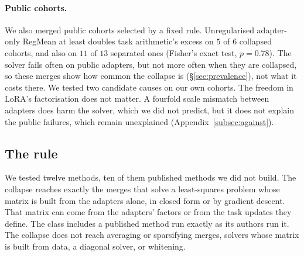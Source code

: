 \paragraph{Public cohorts.} We also merged public cohorts selected by a
fixed rule. Unregularised adapter-only RegMean at least doubles task
arithmetic's excess on $5$ of $6$ collapsed cohorts, and also on $11$ of $13$
separated ones (Fisher's exact test, $p = 0.78$). The solver fails often on
public adapters, but not more often when they are collapsed, so these merges
show how common the collapse is (\S\ref{sec:prevalence}), not what it costs
there. We tested two candidate causes on our own cohorts. The freedom in
LoRA's factorisation does not matter. A fourfold scale mismatch between
adapters does harm the solver, which we did not predict, but it does not
explain the public failures, which remain unexplained
(Appendix~\ref{subsec:against}).

\subsection{The rule}\label{subsec:rule}

We tested twelve methods, ten of them published methods we did not build.
The collapse reaches exactly the merges that solve a least-squares problem whose
matrix is built from the adapters alone, in closed form or by gradient
descent. That matrix can come from the adapters' factors or from the task
updates they define. The class includes a published method run exactly as its
authors run it. The collapse does not reach averaging or sparsifying merges,
solvers whose matrix is built from data, a diagonal solver, or whitening.

